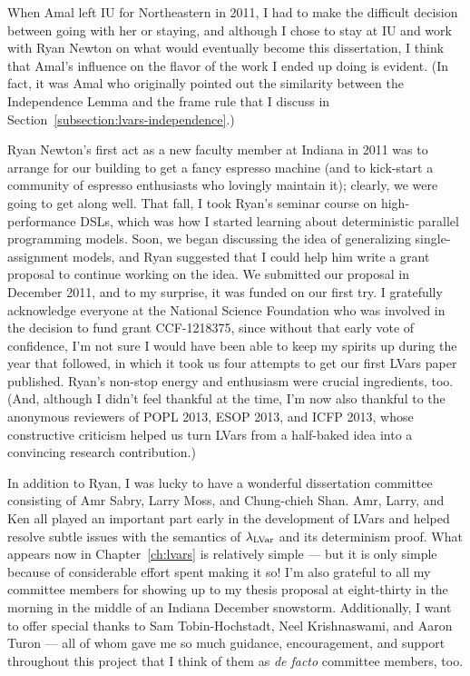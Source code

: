 When Amal left IU for Northeastern in 2011, I had to make the
difficult decision between going with her or staying, and although I
chose to stay at IU and work with Ryan Newton on what would eventually
become this dissertation, I think that Amal's influence on the flavor
of the work I ended up doing is evident.  (In fact, it was Amal who
originally pointed out the similarity between the Independence Lemma
and the frame rule that I discuss in
Section~\ref{subsection:lvars-independence}.)

Ryan Newton's first act as a new faculty member at Indiana in 2011 was
to arrange for our building to get a fancy espresso machine (and to
kick-start a community of espresso enthusiasts who lovingly maintain
it); clearly, we were going to get along well.  That fall, I took
Ryan's seminar course on high-performance DSLs, which was how I
started learning about deterministic parallel programming models.
Soon, we began discussing the idea of generalizing single-assignment
models, and Ryan suggested that I could help him write a grant
proposal to continue working on the idea.  We submitted our proposal
in December 2011, and to my surprise, it was funded on our first try.
I gratefully acknowledge everyone at the National Science Foundation
who was involved in the decision to fund grant CCF-1218375, since
without that early vote of confidence, I'm not sure I would have been
able to keep my spirits up during the year that followed, in which it
took us four attempts to get our first LVars paper published.  Ryan's
non-stop energy and enthusiasm were crucial ingredients, too.  (And,
although I didn't feel thankful at the time, I'm now also thankful to
the anonymous reviewers of POPL 2013, ESOP 2013, and ICFP 2013, whose
constructive criticism helped us turn LVars from a half-baked idea
into a convincing research contribution.)

In addition to Ryan, I was lucky to have a wonderful dissertation
committee consisting of Amr Sabry, Larry Moss, and Chung-chieh Shan.
Amr, Larry, and Ken all played an important part early in the
development of LVars and helped resolve subtle issues with the
semantics of $\lambda_{\textrm{LVar}}$ and its determinism proof.  What appears
now in Chapter~\ref{ch:lvars} is relatively simple --- but it is only
simple because of considerable effort spent making it so!  I'm also
grateful to all my committee members for showing up to my thesis
proposal at eight-thirty in the morning in the middle of an Indiana
December snowstorm.  Additionally, I want to offer special thanks to
Sam Tobin-Hochstadt, Neel Krishnaswami, and Aaron Turon --- all of
whom gave me so much guidance, encouragement, and support throughout
this project that I think of them as \emph{de facto} committee
members, too.

